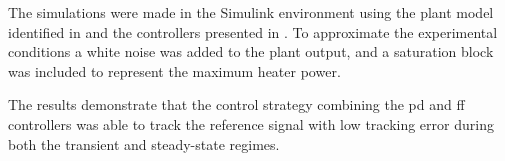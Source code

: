 The simulations were made in the Simulink environment using the plant model
identified in  and the controllers presented in
. To approximate the experimental
conditions a white noise was added to the plant output, and a saturation block
was included to represent the maximum heater power.

The results demonstrate that the control strategy combining the \gls{pd} and
\gls{ff} controllers was able to track the reference signal with low tracking
error during both the transient and steady-state regimes.
